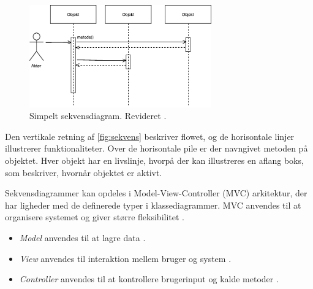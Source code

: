 \begin{figure} [H]
\centering
\includegraphics[width=0.7\textwidth]{figures/sekvens}
\caption{Simpelt sekvensdiagram. Revideret \cite{Brahma2015}.}
\label{fig:sekvens}
\end{figure}

\noindent
Den vertikale retning af \autoref{fig:sekvens} beskriver flowet, og de horisontale linjer illustrerer funktionaliteter. Over de horisontale pile er der navngivet metoden på objektet. Hver objekt har en livslinje, hvorpå der kan illustreres en aflang boks, som beskriver, hvornår objektet er aktivt. \cite{Brahma2015}

Sekvensdiagrammer kan opdeles i Model-View-Controller (MVC) arkitektur, der har ligheder med de definerede typer i klassediagrammer. MVC anvendes til at organisere systemet og giver større fleksibilitet \cite{Brahma2015}. 

\begin{itemize}
\item \textit{Model} anvendes til at lagre data \cite{Brahma2015}.
\item \textit{View} anvendes til interaktion mellem bruger og system \cite{Brahma2015}.
\item \textit{Controller} anvendes til at kontrollere brugerinput og kalde metoder \cite{Brahma2015}.
\end{itemize}